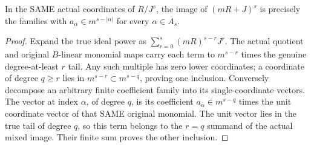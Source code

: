 \begin{lemma}
\label{hir:actual-product-monomial-mixed-maximal-power-coordinates}
\leanok
In the SAME actual coordinates of $R/J^s$, the image of
$(mR+J)^s$ is precisely the families with
$a_\alpha\in m^{s-|\alpha|}$ for every $\alpha\in A_s$.
\end{lemma}
\begin{proof}
Expand the true ideal power as
$\sum_{r=0}^s(mR)^{s-r}J^r$. The actual quotient and original $B$-linear
monomial maps carry each term to $m^{s-r}$ times the genuine degree-at-least
$r$ tail. Any such multiple has zero lower coordinates; a coordinate of
degree $q\ge r$ lies in $m^{s-r}\subset m^{s-q}$, proving one inclusion.
Conversely decompose an arbitrary finite coefficient family into its
single-coordinate vectors. The vector at index $\alpha$, of degree $q$,
is its coefficient $a_\alpha\in m^{s-q}$ times the unit coordinate vector
of that SAME original monomial. The unit vector lies in the true tail
of degree $q$, so this term belongs to the $r=q$ summand of the actual
mixed image. Their finite sum proves the other inclusion.
\end{proof}

